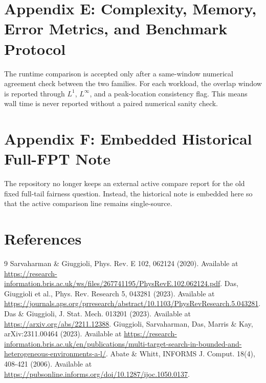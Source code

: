 \documentclass[11pt]{article}
\newcommand{\TabDir}{../artifacts/tables}
\begin{document}
\section{Appendix E: Complexity, Memory, Error Metrics, and Benchmark Protocol}
The runtime comparison is accepted only after a same-window numerical agreement check between the two families. 
For each workload, the overlap window is reported through $L^1$, $L^{\infty}$, and a peak-location consistency flag. 
This means wall time is never reported without a paired numerical sanity check.
\section{Appendix F: Embedded Historical Full-FPT Note}
The repository no longer keeps an external active compare report for the old fixed full-tail fairness question. 
Instead, the historical note is embedded here so that the active comparison line remains single-source.
\begin{table}[H]
\centering\small
\resizebox{\linewidth}{!}{%

}
\caption{Embedded historical fairness note retained inside the unified report.}
\end{table}
\clearpage
\section*{References}
\begin{thebibliography}{9}
 Sarvaharman \& Giuggioli, Phys. Rev. E 102, 062124 (2020). Available at \url{https://research-information.bris.ac.uk/ws/files/267741195/PhysRevE.102.062124.pdf}.
 Das, Giuggioli et al., Phys. Rev. Research 5, 043281 (2023). Available at \url{https://journals.aps.org/prresearch/abstract/10.1103/PhysRevResearch.5.043281}.
 Das \& Giuggioli, J. Stat. Mech. 013201 (2023). Available at \url{https://arxiv.org/abs/2211.12388}.
 Giuggioli, Sarvaharman, Das, Marris \& Kay, arXiv:2311.00464 (2023). Available at \url{https://research-information.bris.ac.uk/en/publications/multi-target-search-in-bounded-and-heterogeneous-environments-a-l/}.
 Abate \& Whitt, INFORMS J. Comput. 18(4), 408-421 (2006). Available at \url{https://pubsonline.informs.org/doi/10.1287/ijoc.1050.0137}.
\end{thebibliography}
\end{document}
